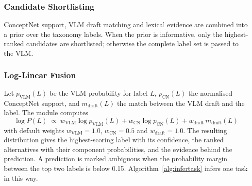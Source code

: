 \subsubsection{Candidate Shortlisting}
ConceptNet support, VLM draft matching and lexical evidence are combined into a prior over the taxonomy labels. When the prior is informative, only the highest-ranked candidates are shortlisted; otherwise the complete label set is passed to the VLM.

\subsubsection{Log-Linear Fusion}
Let $p_{\text{VLM}}(L)$ be the VLM probability for label $L$, $p_{\text{CN}}(L)$ the normalised ConceptNet support, and $m_{\text{draft}}(L)$ the match between the VLM draft and the label. The module computes
\begin{equation}
  \log P(L) \;\propto\; w_{\text{VLM}} \log p_{\text{VLM}}(L)
  + w_{\text{CN}} \log p_{\text{CN}}(L)
  + w_{\text{draft}}\, m_{\text{draft}}(L)
  \label{eq:fusion}
\end{equation}
with default weights $w_{\text{VLM}} = 1.0$, $w_{\text{CN}} = 0.5$ and $w_{\text{draft}} = 1.0$. The resulting distribution gives the highest-scoring label with its confidence, the ranked alternatives with their component probabilities, and the evidence behind the prediction. A prediction is marked ambiguous when the probability margin between the top two labels is below 0.15. Algorithm~\ref{alg:infertask} infers one task in this way.

